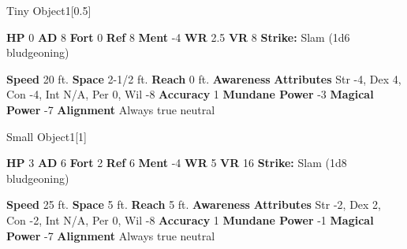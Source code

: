       
  \begin{monsubsection}{Tiny Object}{1}[0.5]
    \vspace{-1em}\vspace{-1em}
    \vspace{0em}

    
    

    \begin{spellcontent}
      \begin{spelltargetinginfo}
        \pari \textbf{HP} 0 \monsep
          \textbf{AD} 8 \monsep
          \textbf{Fort} 0 \monsep
          \textbf{Ref} 8 \monsep
          \textbf{Ment} -4
        \pari \textbf{WR} 2.5 \monsep
        \textbf{VR} 8
        \pari \textbf{Strike:}
            Slam  (1d6 bludgeoning)
      \end{spelltargetinginfo}
    \end{spellcontent}
    \begin{monsterfooter}
      \pari \textbf{Speed} 20 ft. \monsep
        \textbf{Space} 2-1/2 ft. \monsep
        \textbf{Reach} 0 ft.
      \pari \textbf{Awareness} 
      \pari \textbf{Attributes}
        Str -4, Dex 4,
        Con -4, Int N/A,
        Per 0, Wil -8
      \pari \textbf{Accuracy} 1 \monsep
        \textbf{Mundane Power} -3 \monsep
      \textbf{Magical Power} -7
      \pari \textbf{Alignment} Always true neutral
    \end{monsterfooter}
  \end{monsubsection}
  
  

  \begin{monsubsection}{Small Object}{1}[1]
    \vspace{-1em}\vspace{-1em}
    \vspace{0em}

    
    

    \begin{spellcontent}
      \begin{spelltargetinginfo}
        \pari \textbf{HP} 3 \monsep
          \textbf{AD} 6 \monsep
          \textbf{Fort} 2 \monsep
          \textbf{Ref} 6 \monsep
          \textbf{Ment} -4
        \pari \textbf{WR} 5 \monsep
        \textbf{VR} 16
        \pari \textbf{Strike:}
            Slam  (1d8 bludgeoning)
      \end{spelltargetinginfo}
    \end{spellcontent}
    \begin{monsterfooter}
      \pari \textbf{Speed} 25 ft. \monsep
        \textbf{Space} 5 ft. \monsep
        \textbf{Reach} 5 ft.
      \pari \textbf{Awareness} 
      \pari \textbf{Attributes}
        Str -2, Dex 2,
        Con -2, Int N/A,
        Per 0, Wil -8
      \pari \textbf{Accuracy} 1 \monsep
        \textbf{Mundane Power} -1 \monsep
      \textbf{Magical Power} -7
      \pari \textbf{Alignment} Always true neutral
    \end{monsterfooter}
  \end{monsubsection}
  
